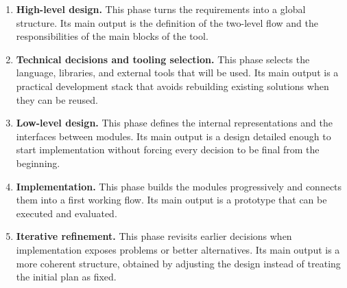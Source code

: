 \begin{enumerate}
The IP pool exposes the data that Level~2 requires to estimate PPA:
the area, timing, idle and active power of each block, together with
the operating point at which they were characterized. It also declares
the technology node, which is reused by the Level~1 calibration.

The output is the last element of
Figure~\ref{fig:talos-input-output}. Talos returns a ranked list of architectures, not a single design: each entry pairs a
Level~1 architecture with the IPs selected for its components,
together with its estimated metrics, its constraint status, and the
mapping of the workload on it. The list is ordered from best to worst
according to the user-selected objectives: by the objective itself
when only one is active, and by the global balanced score
(Section~\ref{subsec:feasibility_ranking}) when several are combined.
Throughout this document, the \emph{winning architecture} refers to
the top-ranked entry of this list; the term therefore reflects the
objectives chosen by the user, not a decision made by the tool.
Preserving the list instead of only the winner is what exposes the
trade-offs between alternatives.

The complete input and configuration requirements are specified in
Appendix~\ref{app:talos_requirements}.

\item \textbf{High-level design.} This phase turns the requirements
into a global structure. Its main output is the definition of the
two-level flow and the responsibilities of the main blocks of the
tool.

\item \textbf{Technical decisions and tooling selection.} This phase
selects the language, libraries, and external tools that will be
used. Its main output is a practical development stack that avoids
rebuilding existing solutions when they can be reused.

\item \textbf{Low-level design.} This phase defines the internal
representations and the interfaces between modules. Its main output
is a design detailed enough to start implementation without
forcing every decision to be final from the beginning.

\item \textbf{Implementation.} This phase builds the modules
progressively and connects them into a first working flow. Its main
output is a prototype that can be executed and evaluated.

\item \textbf{Iterative refinement.} This phase revisits earlier
decisions when implementation exposes problems or better
alternatives. Its main output is a more coherent structure, obtained
by adjusting the design instead of treating the initial plan as fixed.


\end{enumerate}
